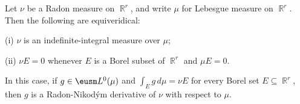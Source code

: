  Let $\nu$ be a Radon measure
on $\BbbR^r$, and write $\mu$ for Lebesgue measure on
$\BbbR^r$.   Then the following are equiveridical:

\quad(i) $\nu$ is an indefinite-integral measure over $\mu$;

\quad(ii) $\nu E=0$ whenever $E$ is a Borel subset of $\BbbR^r$ and
$\mu E=0$.

\noindent In this case, if $g\in\eusm L^0(\mu)$ and
$\int_Eg\,d\mu=\nu E$ for
every Borel set $E\subseteq\BbbR^r$, then $g$ is a Radon-Nikod\'ym
derivative of $\nu$ with respect to $\mu$.

